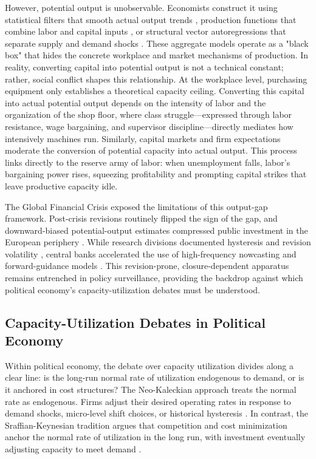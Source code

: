 \documentclass[11pt]{article}
\begin{document}
However, potential output is unobservable. Economists construct it using statistical filters that smooth actual output trends \citep{HodrickPrescott1997, BaxterKing1999, BeveridgeNelson1981, Hamilton2018}, production functions that combine labor and capital inputs \citep{CBO2004PotentialGDP, HavikEtAl2014, Alichi2015}, or structural vector autoregressions that separate supply and demand shocks \citep{BlanchardQuah1989}. These aggregate models operate as a "black box" that hides the concrete workplace and market mechanisms of production. In reality, converting capital into potential output is not a technical constant; rather, social conflict shapes this relationship. At the workplace level, purchasing equipment only establishes a theoretical capacity ceiling. Converting this capital into actual potential output depends on the intensity of labor and the organization of the shop floor, where class struggle---expressed through labor resistance, wage bargaining, and supervisor discipline---directly mediates how intensively machines run. Similarly, capital markets and firm expectations moderate the conversion of potential capacity into actual output. This process links directly to the reserve army of labor: when unemployment falls, labor's bargaining power rises, squeezing profitability and prompting capital strikes that leave productive capacity idle.

The Global Financial Crisis exposed the limitations of this output-gap framework. Post-crisis revisions routinely flipped the sign of the gap, and downward-biased potential-output estimates compressed public investment in the European periphery \citep{Heimberger2017, Heimberger2020}. While research divisions documented hysteresis and revision volatility \citep{CerraSaxena2017, CerraFatasSaxena2023, BarkemaGudmundssonMrkaic2020}, central banks accelerated the use of high-frequency nowcasting and forward-guidance models \citep{AastveitTrovik2014, Berger2023, Foster2024}. This revision-prone, closure-dependent apparatus remains entrenched in policy surveillance, providing the backdrop against which political economy's capacity-utilization debates must be understood.

\subsection{Capacity-Utilization Debates in Political Economy}
\label{subsec:pe_utilization_debates}

Within political economy, the debate over capacity utilization divides along a clear line: is the long-run normal rate of utilization endogenous to demand, or is it anchored in cost structures? The Neo-Kaleckian approach treats the normal rate as endogenous. Firms adjust their desired operating rates in response to demand shocks, micro-level shift choices, or historical hysteresis \citep{Lavoie1995, Nikiforos2013, Setterfield2020}. In contrast, the Sraffian-Keynesian tradition argues that competition and cost minimization anchor the normal rate of utilization in the long run, with investment eventually adjusting capacity to meet demand \citep{Ciccone1986}.
\end{document}
